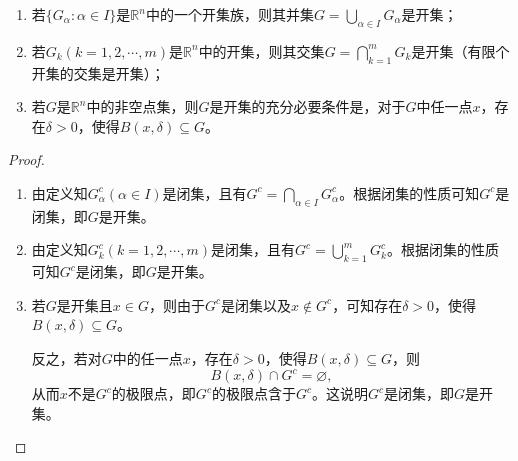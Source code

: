 \documentclass[../../main.tex]{subfiles}%
\begin{document}
\begin{theorem}[开集的基本性质]\label{theorem:开集的运算性质}
\begin{enumerate}[(1)]
\item 若\(\{G_{\alpha}:\alpha\in I\}\)是\(\mathbb{R}^n\)中的一个开集族，则其并集\(G = \bigcup_{\alpha\in I}G_{\alpha}\)是开集；

\item 若\(G_k(k = 1,2,\cdots,m)\)是\(\mathbb{R}^n\)中的开集，则其交集\(G=\bigcap_{k = 1}^{m}G_k\)是开集（有限个开集的交集是开集）；

\item 若\(G\)是\(\mathbb{R}^n\)中的非空点集，则\(G\)是开集的充分必要条件是，对于\(G\)中任一点\(x\)，存在\(\delta>0\)，使得\(B(x,\delta)\subseteq G\)。
\end{enumerate}
\end{theorem}
\begin{proof}
\begin{enumerate}[(1)]
\item 由定义知\(G_{\alpha}^c(\alpha\in I)\)是闭集，且有\(G^c=\bigcap_{\alpha\in I}G_{\alpha}^c\)。根据闭集的性质可知\(G^c\)是闭集，即\(G\)是开集。

\item 由定义知\(G_k^c(k = 1,2,\cdots,m)\)是闭集，且有\(G^c=\bigcup_{k = 1}^{m}G_k^c\)。根据闭集的性质可知\(G^c\)是闭集，即\(G\)是开集。

\item 若\(G\)是开集且\(x\in G\)，则由于\(G^c\)是闭集以及\(x\notin G^c\)，可知存在\(\delta>0\)，使得\(B(x,\delta)\subseteq G\)。

反之，若对\(G\)中的任一点\(x\)，存在\(\delta>0\)，使得\(B(x,\delta)\subseteq G\)，则
\[B(x,\delta)\cap G^c=\varnothing,\]
从而\(x\)不是\(G^c\)的极限点，即\(G^c\)的极限点含于\(G^c\)。这说明\(G^c\)是闭集，即\(G\)是开集。
\end{enumerate}

\end{proof}
\end{document}
